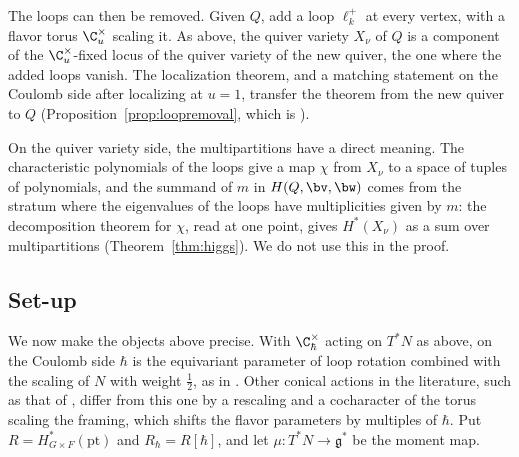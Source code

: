 \documentclass[11pt]{amsart}
\begin{document}
The loops can then be removed.  Given $Q$, add a loop $\ell^+_k$ at every
vertex, with a flavor torus $\C^\times_u$ scaling it.  As above, the quiver
variety $X_\nu$ of $Q$ is a component of the $\C^\times_u$-fixed locus of the
quiver variety of the new quiver, the one where the added loops vanish.  The
localization theorem, and a matching statement on the Coulomb side after
localizing at $u=1$, transfer the theorem from the new quiver to $Q$
(Proposition~\ref{prop:loopremoval}, which is ).

On the quiver variety side, the multipartitions have a direct meaning.  The
characteristic polynomials of the loops give a map $\chi$ from $X_\nu$ to a
space of tuples of polynomials, and the summand of $m$ in $H(Q,\bv,\bw)$ comes
from the stratum where the eigenvalues of the loops have multiplicities given
by $m$: the decomposition theorem for $\chi$, read at one point, gives
$H^*(X_\nu)$ as a sum over multipartitions (Theorem~\ref{thm:higgs}).  We do
not use this in the proof.


\subsection{Set-up}\label{ss:setup}
We now make the objects above precise.  With $\C^\times_\hbar$ acting on $T^*N$
as above, on the Coulomb side $\hbar$ is the equivariant parameter of loop rotation
combined with the scaling of $N$ with weight $\frac12$, as in
\cite[\S\S2.2, 5.7]{hilburnBFNSpringer2023}.  Other conical actions in the literature, such as
that of \cite[\S7.2]{KTWWY}, differ from this one by a rescaling and a
cocharacter of the torus scaling the framing, which shifts the flavor
parameters by multiples of $\hbar$.  Put $R=H^*_{G\times
F}(\mathrm{pt})$ and $R_\hbar=R[\hbar]$, and let $\mu\colon T^*N\to\mathfrak g^*$
be the moment map.
\end{document}
